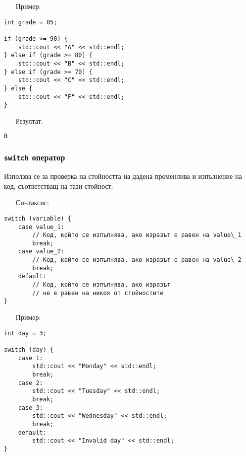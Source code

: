 \documentclass[oneside]{book}
\newcommand*{\code}[1]{\texttt{#1}}
\begin{document}
\begin{itemize}\item[Пример:]\end{itemize}\vspace{-6pt}
\begin{mdframed}\begin{lstlisting}
int grade = 85;

if (grade >= 90) {
    std::cout << "A" << std::endl;
} else if (grade >= 80) {
    std::cout << "B" << std::endl;
} else if (grade >= 70) {
    std::cout << "C" << std::endl;
} else {
    std::cout << "F" << std::endl;
}
\end{lstlisting}\end{mdframed}
\pagebreak
\begin{itemize}\item[Резултат:]\end{itemize}\vspace{-18pt}
\begin{mdframed}\begin{lstlisting}[language=bash]
B
\end{lstlisting}\end{mdframed}

\subsubsection{\code{switch} оператор}
Използва се за проверка на стойността на дадена променлива и изпълнение на код, съответстващ на тази стойност.

\begin{itemize}\item[Синтаксис:]\end{itemize}\vspace{-12pt}
\begin{mdframed}\begin{lstlisting}
switch (variable) {
    case value_1:
        // Код, който се изпълнява, ако изразът е равен на value\_1
        break;
    case value_2:
        // Код, който се изпълнява, ако изразът е равен на value\_2
        break;
    default:
        // Код, който се изпълнява, ако изразът
        // не е равен на никоя от стойностите
}
\end{lstlisting}\end{mdframed}\vspace{-16pt}

\begin{itemize}\item[Пример:]\end{itemize}\vspace{-12pt}
\begin{mdframed}\begin{lstlisting}
int day = 3;

switch (day) {
    case 1:
        std::cout << "Monday" << std::endl;
        break;
    case 2:
        std::cout << "Tuesday" << std::endl;
        break;
    case 3:
        std::cout << "Wednesday" << std::endl;
        break;
    default:
        std::cout << "Invalid day" << std::endl;
}
\end{lstlisting}\end{mdframed}\vspace{-16pt}
\end{document}
